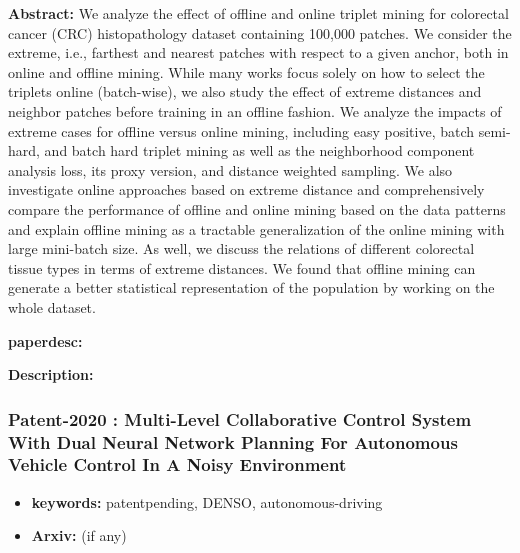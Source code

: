 \documentclass{article}
\begin{document}

\textbf{Abstract:} We analyze the effect of offline and online triplet mining for colorectal cancer (CRC) histopathology dataset containing 100,000 patches. We consider the extreme, i.e., farthest and nearest patches with respect to a given anchor, both in online and offline mining. While many works focus solely on how to select the triplets online (batch-wise), we also study the effect of extreme distances and neighbor patches before training in an offline fashion. We analyze the impacts of extreme cases for offline versus online mining, including easy positive, batch semi-hard, and batch hard triplet mining as well as the neighborhood component analysis loss, its proxy version, and distance weighted sampling. We also investigate online approaches based on extreme distance and comprehensively compare the performance of offline and online mining based on the data patterns and explain offline mining as a tractable generalization of the online mining with large mini-batch size. As well, we discuss the relations of different colorectal tissue types in terms of extreme distances. We found that offline mining can generate a better statistical representation of the population by working on the whole dataset.

\textbf{paperdesc:} 

\textbf{Description:} 



\newpage
\subsubsection{\textbf{Patent-2020} : Multi-Level Collaborative Control System With Dual Neural Network Planning For Autonomous Vehicle Control In A Noisy Environment}
\begin{itemize}
\item \textbf{keywords:} patentpending, DENSO, autonomous-driving
\item \textbf{Arxiv:}  (if any)
\end{itemize}
\end{document}
